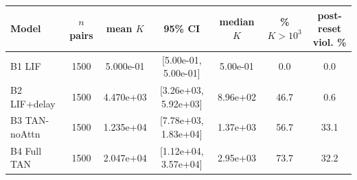\begingroup\setlength{\tabcolsep}{3pt}\begin{tabular}{lcccccc}
\toprule
Model & $n$ pairs & mean $K$ & 95\% CI & median $K$ & \% $K{>}10^3$ & post-reset viol. \% \\
\midrule
B1 LIF & 1500 & 5.000e-01 & [5.00e-01, 5.00e-01] & 5.00e-01 & 0.0 & 0.0 \\
B2 LIF+delay & 1500 & 4.470e+03 & [3.26e+03, 5.92e+03] & 8.96e+02 & 46.7 & 0.6 \\
B3 TAN-noAttn & 1500 & 1.235e+04 & [7.78e+03, 1.83e+04] & 1.37e+03 & 56.7 & 33.1 \\
B4 Full TAN & 1500 & 2.047e+04 & [1.12e+04, 3.57e+04] & 2.95e+03 & 73.7 & 32.2 \\
\bottomrule
\end{tabular}\endgroup
